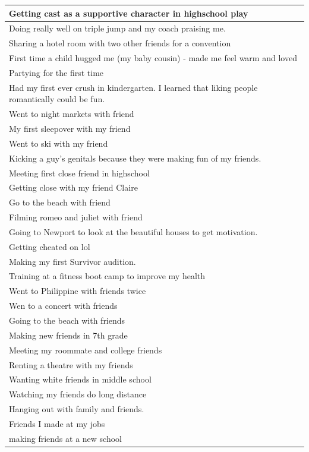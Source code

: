 \documentclass[
  .7em,
  letterpaper,
  DIV=11,
  numbers=noendperiod]{scrartcl}
\begin{document}
\begin{table}
\begin{tabular}{l}
\hline
Getting cast as a supportive character in highschool play\\
\hline
Doing really well on triple jump and my coach praising me.\\
\hline
Sharing a hotel room with two other friends for a convention\\
\hline
First time a child hugged me (my baby cousin) - made me feel warm and loved\\
\hline
Partying for the first time\\
\hline
Had my first ever crush in kindergarten. I learned that liking people romantically could be fun.\\
\hline
Went to night markets with friend\\
\hline
My first sleepover with my friend\\
\hline
Went to ski with my friend\\
\hline
Kicking a guy's genitals because they were making fun of my friends.\\
\hline
Meeting first close friend in highschool\\
\hline
Getting close with my friend Claire\\
\hline
Go to the beach with friend\\
\hline
Filming romeo and juliet with friend\\
\hline
Going to Newport to look at the beautiful houses to get motivation.\\
\hline
Getting cheated on lol\\
\hline
Making my first Survivor audition.\\
\hline
Training at a fitness boot camp to improve my health\\
\hline
Went to Philippine with friends twice\\
\hline
Wen to a concert with friends\\
\hline
Going to the beach with friends\\
\hline
Making new friends in 7th grade\\
\hline
Meeting my roommate and college friends\\
\hline
Renting a theatre with my friends\\
\hline
Wanting white friends in middle school\\
\hline
Watching my friends do long distance\\
\hline
Hanging out with family and friends.\\
\hline
Friends I made at my jobs\\
\hline
making friends at a new school\\

\end{tabular}
\end{table}
\end{document}
